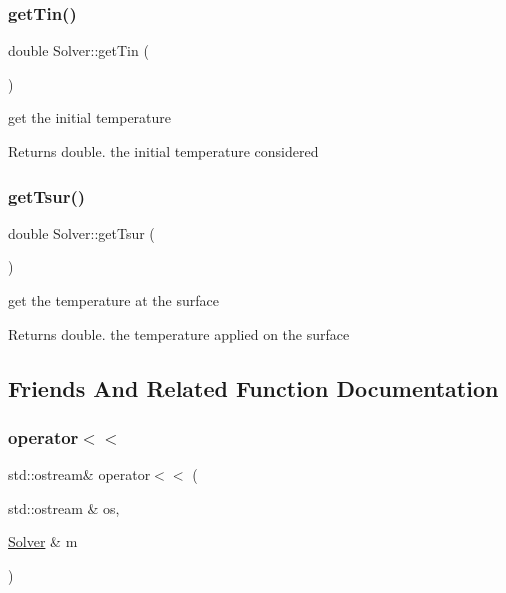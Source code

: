 \subsubsection{\texorpdfstring{get\+Tin()}{getTin()}}
{\footnotesize\ttfamily double Solver\+::get\+Tin (\begin{DoxyParamCaption}{ }\end{DoxyParamCaption})}

get the initial temperature
\begin{DoxyItemize}
\item \begin{DoxyReturn}{Returns}
double. the initial temperature considered 
\end{DoxyReturn}

\end{DoxyItemize}\mbox{\label{classSolver_a652cc726a9f3e46239e3a2953e95495c}} 
\subsubsection{\texorpdfstring{get\+Tsur()}{getTsur()}}
{\footnotesize\ttfamily double Solver\+::get\+Tsur (\begin{DoxyParamCaption}{ }\end{DoxyParamCaption})}

get the temperature at the surface
\begin{DoxyItemize}
\item \begin{DoxyReturn}{Returns}
double. the temperature applied on the surface 
\end{DoxyReturn}

\end{DoxyItemize}

\subsection{Friends And Related Function Documentation}
\mbox{\label{classSolver_a6971051b04802402e5cbf2fda5041041}} 
\subsubsection{\texorpdfstring{operator$<$$<$}{operator<<}\hspace{0.1cm}{\footnotesize\ttfamily [1/2]}}
{\footnotesize\ttfamily std\+::ostream\& operator$<$$<$ (\begin{DoxyParamCaption}\item[{std\+::ostream \&}]{os,  }\item[{\mbox{\hyperlink{classSolver}{Solver}} \&}]{m }\end{DoxyParamCaption})\hspace{0.3cm}{\ttfamily [friend]}}

